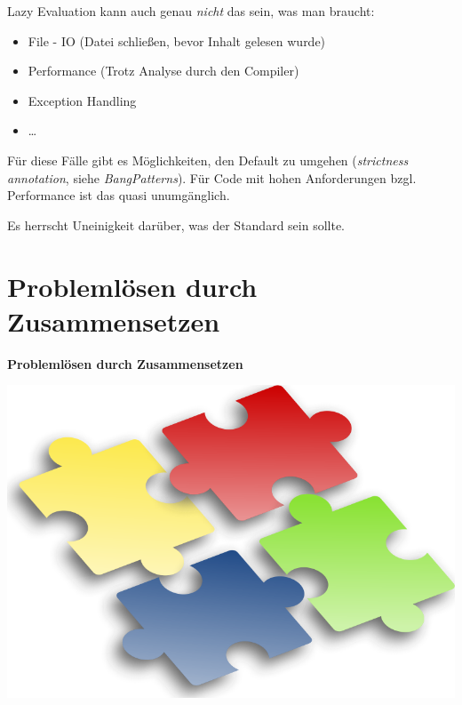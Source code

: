 \documentclass[unknownkeysallowed]{beamer}
\begin{document}
\begin{frame}

Lazy Evaluation kann auch genau \emph{nicht} das sein, was man braucht:

\begin{itemize}
\item File - IO   (Datei schließen, bevor Inhalt gelesen wurde) \pause
\item Performance (Trotz Analyse durch den Compiler)            \pause
\item Exception Handling                                        \pause
\item \dots \pause
\end{itemize}

\bigskip

Für diese Fälle gibt es Möglichkeiten, den Default zu umgehen (\emph{strictness annotation}, siehe \emph{BangPatterns}). Für Code mit hohen Anforderungen bzgl. Performance ist das quasi unumgänglich. \bigskip \pause

Es herrscht Uneinigkeit darüber, was der Standard sein sollte.

\end{frame}

  
\section{Problemlösen durch Zusammensetzen}
\begin{frame}

    \begin{center}
    \Large\textbf{Problemlösen durch Zusammensetzen} \bigskip \bigskip
    
    \includegraphics[scale=0.175]{ben-Jigsaw-puzzle-2.png} 
    \end{center}

\end{frame}
\end{document}
